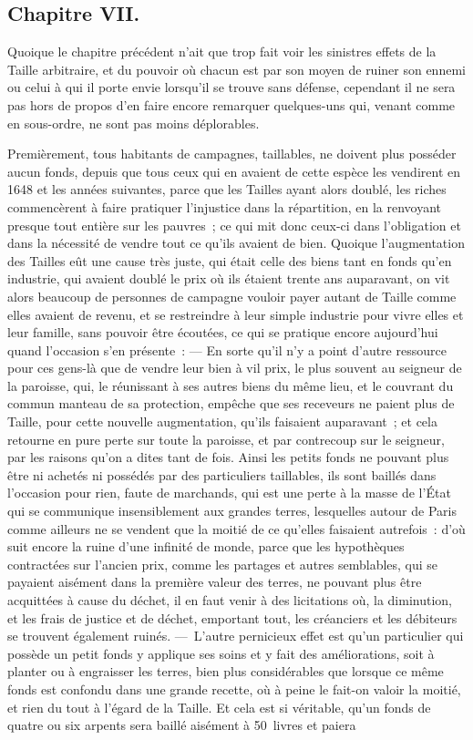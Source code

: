 \documentclass[french,twoside]{book} %
\begin{document}
\subsection[{Chapitre VII.}]{Chapitre VII.}
\noindent Quoique le chapitre précédent n’ait que trop fait voir les sinistres effets de la Taille arbitraire, et du pouvoir où chacun est par son moyen de ruiner son ennemi ou celui à qui il porte envie lorsqu’il se trouve sans défense, cependant il ne sera pas hors de propos d’en faire encore remarquer quelques-uns qui, venant comme en sous-ordre, ne sont pas moins déplorables.\par
Premièrement, tous habitants de campagnes, taillables, ne doivent plus posséder aucun fonds, depuis que tous ceux qui en avaient de cette espèce les vendirent en 1648 et les années suivantes, parce que les Tailles ayant alors doublé, les riches commencèrent à faire pratiquer l’injustice dans la répartition, en la renvoyant presque tout entière sur les pauvres ; ce qui mit donc ceux-ci dans l’obligation et dans la nécessité de vendre tout ce qu’ils avaient de bien. Quoique l’augmentation des Tailles eût une cause très juste, qui était celle des biens tant en fonds qu’en industrie, qui avaient doublé le prix où ils étaient trente ans auparavant, on vit alors beaucoup de personnes de campagne vouloir payer autant de Taille comme elles avaient de revenu, et se restreindre à leur simple industrie pour vivre elles et leur famille, sans pouvoir être écoutées, ce qui se pratique encore aujourd’hui quand l’occasion s’en présente : — En sorte qu’il n’y a point d’autre ressource pour ces gens-là que de vendre leur bien à vil prix, le plus souvent au seigneur de la paroisse, qui, le réunissant à ses autres biens du même lieu, et le couvrant du commun manteau de sa protection, empêche que ses receveurs ne paient plus de Taille, pour cette nouvelle augmentation, qu’ils faisaient auparavant ; et cela retourne en pure perte sur toute la paroisse, et par contrecoup sur le seigneur, par les raisons qu’on a dites tant de fois. Ainsi les petits fonds ne pouvant plus être ni achetés ni possédés par des particuliers taillables, ils sont baillés dans l’occasion pour rien, faute de marchands, qui est une perte à la masse de l’État qui se communique insensiblement aux grandes terres, lesquelles autour de Paris comme ailleurs ne se vendent que la moitié de ce qu’elles faisaient autrefois : d’où suit encore la ruine d’une infinité de monde, parce que les hypothèques contractées sur l’ancien prix, comme les partages et autres semblables, qui se payaient aisément dans la première valeur des terres, ne pouvant plus être acquittées à cause du déchet, il en faut venir à des licitations où, la diminution, et les frais de justice et de déchet, emportant tout, les créanciers et les débiteurs se trouvent également ruinés. — L’autre pernicieux effet est qu’un particulier qui possède un petit fonds y applique ses soins et y fait des améliorations, soit à planter ou à engraisser les terres, bien plus considérables que lorsque ce même fonds est confondu dans une grande recette, où à peine le fait-on valoir la moitié, et rien du tout à l’égard de la Taille. Et cela est si véritable, qu’un fonds de quatre ou six arpents sera baillé aisément à 50 livres et paiera 
\end{document}
